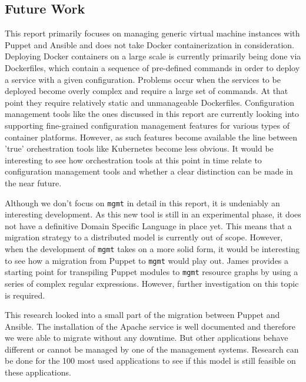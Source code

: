 \subsection{Future Work}\label{subsec:futurework}
This report primarily focuses on managing generic virtual machine instances with Puppet and Ansible and does not take Docker containerization in consideration. Deploying Docker containers on a large scale is currently primarily being done via Dockerfiles, which contain a sequence of pre-defined commands in order to deploy a service with a given configuration. Problems occur when the services to be deployed become overly complex and require a large set of commands. At that point they require relatively static and unmanageable Dockerfiles. Configuration management tools like the ones discussed in this report are currently looking into supporting fine-grained configuration management features for various types of container platforms. However, as such features become available the line between 'true' orchestration tools like Kubernetes \cite{kubernetes_2016} become less obvious. It would be interesting to see how orchestration tools at this point in time relate to configuration management tools and whether a clear distinction can be made in the near future.

Although we don't focus on \texttt{mgmt} in detail in this report, it is undeniably an interesting development. As this new tool is still in an experimental phase, it does not have a definitive Domain Specific Language in place yet. This means that a migration strategy to a distributed model is currently out of scope. However, when the development of \texttt{mgmt} takes on a more solid form, it would be interesting to see how a migration from Puppet to \texttt{mgmt} would play out. James \cite{frank_2016} provides a starting point for transpiling Puppet modules to \texttt{mgmt} resource graphs by using a series of complex regular expressions. However, further investigation on this topic is required.

This research looked into a small part of the migration between Puppet and Ansible. The installation of the Apache service is well documented and therefore we were able to migrate without any downtime. But other applications behave different or cannot be managed by one of the management systems. Research can be done for the 100 most used applications to see if this model is still feasible on these applications. 
